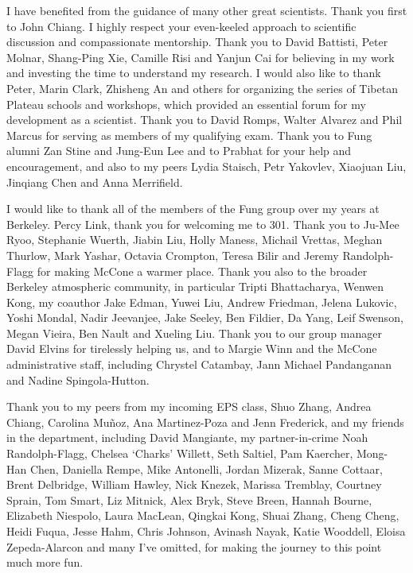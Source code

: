\documentclass{ucbthesis}
\begin{document}
\begin{frontmatter}
\begin{acknowledgements}
I have benefited from the guidance of many other great scientists. Thank you first to John Chiang. I highly respect your even-keeled approach to scientific discussion and compassionate mentorship. Thank you to David Battisti, Peter Molnar, Shang-Ping Xie, Camille Risi and Yanjun Cai for believing in my work and investing the time to understand my research. I would also like to thank Peter, Marin Clark, Zhisheng An and others for organizing the series of Tibetan Plateau schools and workshops, which provided an essential forum for my development as a scientist. Thank you to David Romps, Walter Alvarez and Phil Marcus for serving as members of my qualifying exam. Thank you to Fung alumni Zan Stine and Jung-Eun Lee and to Prabhat for your help and encouragement, and also to my peers Lydia Staisch, Petr Yakovlev, Xiaojuan Liu, Jinqiang Chen and Anna Merrifield.

I would like to thank all of the members of the Fung group over my years at Berkeley. Percy Link, thank you for welcoming me to 301. Thank you to Ju-Mee Ryoo, Stephanie Wuerth, Jiabin Liu, Holly Maness, Michail Vrettas, Meghan Thurlow, Mark Yashar, Octavia Crompton, Teresa Bilir and Jeremy Randolph-Flagg for making McCone a warmer place. Thank you also to the broader Berkeley atmospheric community, in particular Tripti Bhattacharya, Wenwen Kong, my coauthor Jake Edman, Yuwei Liu, Andrew Friedman, Jelena Lukovic, Yoshi Mondal, Nadir Jeevanjee, Jake Seeley, Ben Fildier, Da Yang, Leif Swenson, Megan Vieira, Ben Nault and Xueling Liu. Thank you to our group manager David Elvins for tirelessly helping us, and to Margie Winn and the McCone administrative staff, including Chrystel Catambay, Jann Michael Pandanganan and Nadine Spingola-Hutton.

Thank you to my peers from my incoming EPS class, Shuo Zhang, Andrea Chiang, Carolina Mu\~{n}oz, Ana Martinez-Poza and Jenn Frederick, and my friends in the department, including David Mangiante, my partner-in-crime Noah Randolph-Flagg, Chelsea `Charks' Willett, Seth Saltiel, Pam Kaercher, Mong-Han Chen, Daniella Rempe, Mike Antonelli, Jordan Mizerak, Sanne Cottaar, Brent Delbridge, William Hawley, Nick Knezek, Marissa Tremblay, Courtney Sprain, Tom Smart, Liz Mitnick, Alex Bryk, Steve Breen, Hannah Bourne, Elizabeth Niespolo, Laura MacLean, Qingkai Kong, Shuai Zhang, Cheng Cheng, Heidi Fuqua, Jesse Hahm, Chris Johnson, Avinash Nayak, Katie Wooddell, Eloisa Zepeda-Alarcon and many I've omitted, for making the journey to this point much more fun. 


\end{acknowledgements}
\end{frontmatter}
\end{document}
